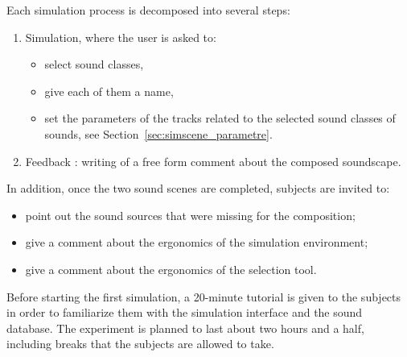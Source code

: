 \documentclass[12pt]{elsarticle}
\providecommand{\DIFadd}[1]{{\protect\color{blue}\uwave{#1}}} %
\providecommand{\DIFaddbegin}{} %
\providecommand{\DIFaddend}{} %
\begin{document}
Each simulation process is decomposed into several steps:

 \begin{enumerate} 
\item Simulation, where the user is asked to:
   \begin{itemize} 
  \item  select sound classes,
  \item  give \DIFaddbegin \DIFadd{to }\DIFaddend each of them a name,
  \item  set the parameters of the tracks related to the selected sound classes of sounds, see Section~\ref{sec:simscene_parametre}.
   \end{itemize} 
\item Feedback : writing of a free form comment about the composed soundscape.
 \end{enumerate} 

%

In addition, once the two sound scenes are completed, subjects are invited to:

 \begin{itemize} 
\item  point out the sound sources that were missing for the composition;
\item  give a comment about the ergonomics of the simulation environment;
\item  give a comment about the ergonomics of the selection tool.
 \end{itemize} 


Before starting the first simulation, a 20-minute tutorial is given to the subjects in order to familiarize them with the simulation interface and the sound database. The experiment is planned to last about two hours and a half, including breaks that the subjects are allowed to take.
\end{document}
